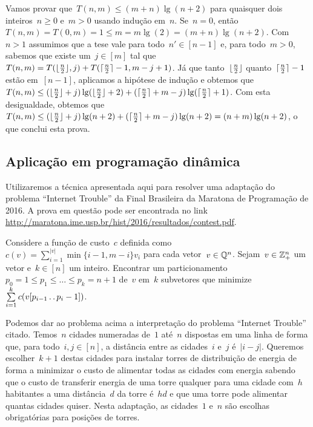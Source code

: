 Vamos provar que~$T(n,m) \leq (m+n)\lg(n + 2)$ para quaisquer dois inteiros~${ n \geq 0 }$ e~$m > 0$ usando indução em~$n$. Se~${ n = 0 }$, então~${ T(n,m) = T(0,m) = 1 \leq m = m\lg(2) =  (m + n)\lg(n+2) }$. Com~${ n > 1 }$ assumimos que a tese vale para todo~${ n' \in [n-1] }$ e, para todo~$m > 0$, sabemos que existe um~${ j \in [m] }$ tal que~${ T(n,m) = T(\lfloor \frac{n}{2} \rfloor,j) + T(\lceil \frac{n}{2} \rceil - 1, m - j + 1) }$. Já que tanto~$\lfloor \frac{n}{2} \rfloor$ quanto~$\lceil \frac{n}{2} \rceil - 1$ estão em~$[n-1]$, aplicamos a hipótese de indução e obtemos que~${ T(n,m) \leq (\lfloor \frac{n}{2} \rfloor + j)\lg(\lfloor \frac{n}{2} \rfloor + 2) + (\lceil \frac{n}{2} \rceil + m - j)\lg(\lceil \frac{n}{2} \rceil + 1) }$. Com esta desigualdade, obtemos que~${ T(n,m) \leq (\lfloor \frac{n}{2} \rfloor + j)\lg(n + 2) + (\lceil \frac{n}{2} \rceil + m - j)\lg(n + 2) = (n + m)\lg(n+2) }$, o que conclui esta prova.

\subsection{Aplicação em programação dinâmica} \label{DivConq:DP}
Utilizaremos a técnica apresentada aqui para resolver uma adaptação do problema ``Internet Trouble'' da Final Brasileira da Maratona de Programação de 2016. A prova em questão pode ser encontrada no link \url{http://maratona.ime.usp.br/hist/2016/resultados/contest.pdf}.  

\begin{prob} \label{DivConq:InternetTrouble}
Considere a função de custo~$c$ definida como~${ c(v) = \sum\limits_{i=1}^{|v|} \min\{i-1,m-i\} v_i }$ para cada vetor~${ v \in \mathbb{Q}^n }$. Sejam~${ v \in \mathbb{Z}_+^n }$ um vetor e~$k \in [n]$ um inteiro. Encontrar um particionamento~${ p_0 = 1 \leq p_1 \leq \dots \leq p_k = n + 1 }$ de~$v$ em~$k$ subvetores que minimize~${ \sum\limits_{ i = 1 }^k c(v[p_{i-1} \,.\,.\, p_i - 1]) }$.
\end{prob}

Podemos dar ao problema acima a interpretação do problema ``Internet Trouble'' citado. Temos~$n$ cidades numeradas de~$1$ até~$n$ dispostas em uma linha de forma que, para todo~$i,j \in [n]$, a distância entre as cidades~$i$ e~$j$ é~$|i-j|$. Queremos escolher~$k + 1$ destas cidades para instalar torres de distribuição de energia de forma a minimizar o custo de alimentar todas as cidades com energia sabendo que o custo de transferir energia de uma torre qualquer para uma cidade com~$h$ habitantes a uma distância~$d$ da torre é~$hd$ e que uma torre pode alimentar quantas cidades quiser. Nesta adaptação, as cidades~$1$ e~$n$ são escolhas obrigatórias para posições de torres. 

